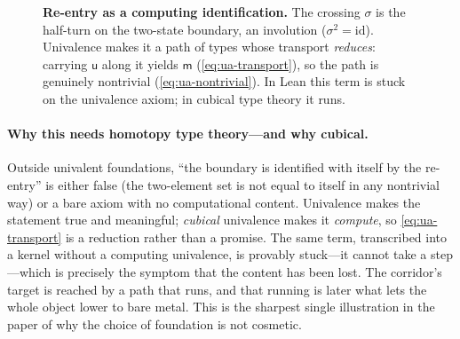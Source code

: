 \documentclass[11pt,letterpaper]{article}
\theoremstyle{plain}
\theoremstyle{definition}
\theoremstyle{remark}
\newcommand{\ua}{\mathsf{ua}}                           %
\newcommand{\transport}{\mathsf{transp}}
\newcommand{\unmk}{\mathsf{u}}                          %
\newcommand{\mkd}{\mathsf{m}}                           %
\newcommand{\cross}{\sigma}                             %
\begin{document}
\begin{figure}[t]
\centering
{}
\caption{\textbf{Re-entry as a computing identification.} The crossing $\cross$ is
the half-turn on the two-state boundary, an involution ($\cross^2=\mathrm{id}$).
Univalence makes it a path of types whose transport \emph{reduces}: carrying
$\unmk$ along it yields $\mkd$ (\cref{eq:ua-transport}), so the path is genuinely
nontrivial (\cref{eq:ua-nontrivial}). In Lean this term is stuck on the univalence
axiom; in cubical type theory it runs.}
\label{fig:crossing}
\end{figure}

\paragraph{Why this needs homotopy type theory---and why cubical.}
Outside univalent foundations, ``the boundary is identified with itself by the
re-entry'' is either false (the two-element set is not equal to itself in any
nontrivial way) or a bare axiom with no computational content. Univalence makes
the statement true and meaningful; \emph{cubical} univalence makes it
\emph{compute}, so \cref{eq:ua-transport} is a reduction rather than a promise.
The same term, transcribed into a kernel without a computing univalence, is
provably stuck---it cannot take a step---which is precisely the symptom that the
content has been lost. The corridor's target is reached by a path that runs, and
that running is later what lets the whole object lower to bare metal. This is the
sharpest single illustration in the paper of why the choice of foundation is not
cosmetic.
\end{document}
